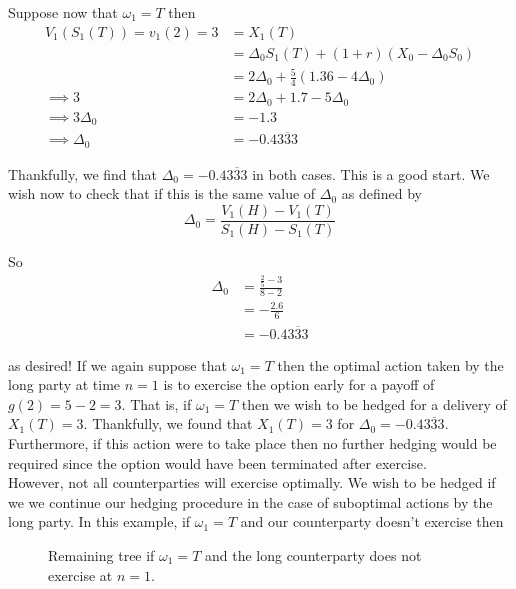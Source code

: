 \documentclass[12pt]{article}
\newlength\tindent
\renewcommand{\indent}{\hspace*{\tindent}}
\begin{document}
Suppose now that $\omega_1 = T$ then
\begin{align*}
	V_1(S_1(T)) = v_1(2) = 3 &= X_1(T) \\
	&= \Delta_0S_1(T) + (1 + r)(X_0 - \Delta_0S_0) \\
	&= 2\Delta_0 + \frac{5}{4}(1.36 - 4\Delta_0) \\
	\implies 3 &= 2\Delta_0 + 1.7 - 5\Delta_0 \\
	\implies 3\Delta_0 &= -1.3 \\
	\implies \Delta_0 &= -0.4\overline{333}
\end{align*}

Thankfully, we find that $\Delta_0 = -0.4\overline{333}$ in both cases. This is a good start. We wish now to check that if this is the same value of $\Delta_0$ as defined by
\begin{equation*}
	\Delta_0 = \frac{V_1(H) - V_1(T)}{S_1(H) - S_1(T)}
\end{equation*}

So
\begin{align*}
	\Delta_0 &= \frac{ \frac{2}{5} - 3 }{ 8 - 2} \\
	&= -\frac{2.6}{6} \\
	&= -0.4\overline{333}
\end{align*}

as desired! If we again suppose that $\omega_1 = T$ then the optimal action taken by the long party at time $n = 1$ is to exercise the option early for a payoff of $g(2) = 5 - 2 = 3$. That is, if $\omega_1 = T$ then we wish to be hedged for a delivery of $X_1(T) = 3$. Thankfully, we found that $X_1(T) = 3$ for $\Delta_0 = -0.4\overline{333}$. Furthermore, if this action were to take place then no further hedging would be required since the option would have been terminated after exercise. \\

\indent However, not all counterparties will exercise optimally. We wish to be hedged if we we continue our hedging procedure in the case of suboptimal actions by the long party. In this example, if $\omega_1 = T$ and our counterparty doesn't exercise then
\begin{figure}[H]
\centering
{}
\caption{Remaining tree if $\omega_1 = T$ and the long counterparty does not exercise at $n = 1$.}
\end{figure}
\end{document}
